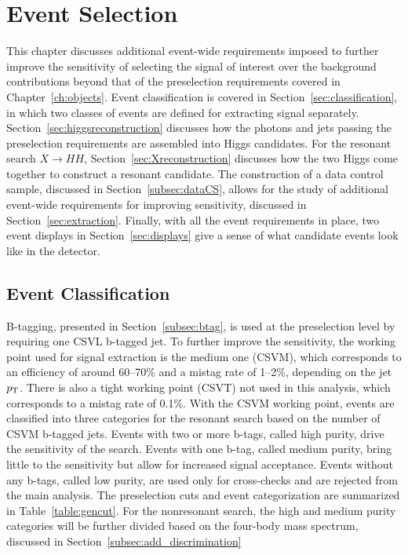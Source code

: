 \chapter{Event Selection\label{ch:selection}}

This chapter discusses additional event-wide requirements imposed to further
improve the sensitivity of selecting the signal of interest over the background contributions
beyond that of the preselection requirements covered in Chapter~\ref{ch:objects}.
Event classification is covered in Section~\ref{sec:classification}, in which two classes of
events are defined for extracting signal separately.
Section~\ref{sec:higgsreconstruction} discusses how the photons and jets passing the preselection
requirements are assembled into Higgs candidates. For the resonant search $X\rightarrow HH$,
Section~\ref{sec:Xreconstruction} discusses how the two Higgs come together to construct a resonant
candidate. The construction of a data control
sample, discussed in Section~\ref{subsec:dataCS}, allows for the study of additional event-wide
requirements for improving sensitivity, discussed in Section~\ref{sec:extraction}.
Finally, with all the event requirements in place, two event displays in Section~\ref{sec:displays}
give a sense of what candidate events look like in the detector.

\section{Event Classification\label{sec:classification}}

B-tagging, presented in Section~\ref{subsec:btag}, is used at the preselection level by
requiring one CSVL b-tagged jet. To further improve the sensitivity, the working point used for
signal extraction is the medium one (CSVM), which corresponds to an efficiency of around 60--70\%
and a mistag rate of 1--2\%, depending on the jet $p_{\rm T}$.
There is also a tight working point (CSVT) not used in this analysis,
which corresponds to a mistag rate of 0.1\%.
With the CSVM working point, events are classified into three categories for the resonant search
based on the number of CSVM b-tagged jets. Events with two or more b-tags, called high purity,
drive the sensitivity of the search. Events with one b-tag, called medium purity,
bring little to the sensitivity
but allow for increased signal acceptance. Events without any b-tags,
called low purity, are used only for cross-checks and are rejected from the main analysis.
The preselection cuts and event categorization
are summarized in Table~\ref{table:gencut}.
For the nonresonant search, the high and medium purity categories will be further divided based
on the four-body mass spectrum, discussed in Section~\ref{subsec:add_discrimination}

